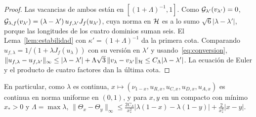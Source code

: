 \begin{proof}
Las vacancias de ambos están en $[(1+\Lambda)^{-1},1]$. Como ${\mathcal{G}}_{\lambda'}(v_{\lambda'})=0$,
${\mathcal{G}}_{\lambda,f}(v_{\lambda'})=(\lambda-\lambda')\,u_{f,\lambda'}J_f(u_{\lambda'})$, cuya norma en ${\mathcal{H}}$
es a lo sumo $\sqrt6|\lambda-\lambda'|$, porque las longitudes de los cuatro dominios suman seis. El
Lema~\ref{lem:estabilidad} con $\kappa'=(1+\Lambda)^{-1}$ da la primera cota. Comparando
$u_{f,\lambda}=1/(1+\lambda J_f(u_\lambda))$ con su versión en $\lambda'$ y usando~\eqref{eq:conversion},
$\|u_{f,\lambda}-u_{f,\lambda'}\|_\infty\le|\lambda-\lambda'|+\Lambda\sqrt3\,\|v_\lambda-v_{\lambda'}\|_{\mathcal{H}}\le C_\Lambda|\lambda-\lambda'|$.
La ecuación de Euler y el producto de cuatro factores dan la última cota.
\end{proof}

En particular, como $\lambda$ es continua, $x\mapsto(\nu_{1-x},u_{R,x},u_{C,x},u_{D,x},u_{A,x})$ es
continua en norma uniforme en $(0,1)$, y para $x,y$ en un compacto con mínimo $x_*>0$ y
$\Lambda=\max\lambda$,
$\|\Theta_x-\Theta_y\|_\infty\le\frac{2C_\Lambda}{x_*^2}|\lambda(1-x)-\lambda(1-y)|+\frac2{x_*^3}|x-y|$.
